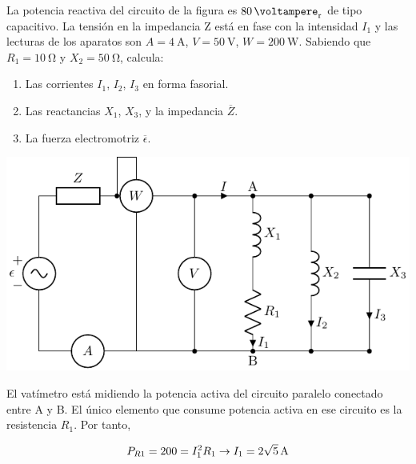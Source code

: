 \documentclass[12pt]{article}
\begin{document}

La potencia reactiva del circuito de la figura es $\SI{80}{\voltampere_r}$ de tipo capacitivo. La tensión en la impedancia Z está en fase con la intensidad $I_1$ y las lecturas de los aparatos son $A = \SI{4}{\ampere}$, $V = \SI{50}{\volt}$, $W = \SI{200}{\watt}$. Sabiendo que $R_1 = \SI{10}{\ohm}$ y $X_2 = \SI{50}{\ohm}$, calcula:

\begin{enumerate}
\item Las corrientes $I_1$, $I_2$, $I_3$ en forma fasorial.
\item Las reactancias $X_1$, $X_3$, y la impedancia $\overline{Z}$.
\item La fuerza electromotriz $\overline{\epsilon}$.
\end{enumerate}
\begin{center}
  \includegraphics{figs/problema12}
\end{center}

El vatímetro está midiendo la potencia activa del circuito paralelo conectado entre A y B. El único elemento que consume potencia activa en ese circuito es la resistencia $R_1$. Por tanto,

\[
  P_{R1} = 200 = I_1^2 R_1 \rightarrow I_1 = \SI[parse-numbers=false]{2\sqrt{5}}{\ampere}
\]
\end{document}
